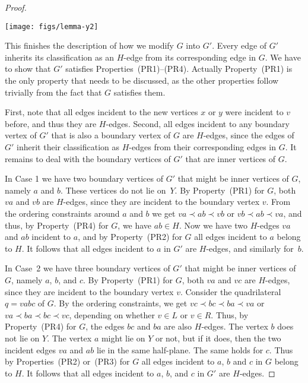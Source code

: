 \begin{proof}
	\begin{figure*}[ht]
          \centering\texttt{[image: figs/lemma-y2]}
          \caption{Proof of  for a reflex
            vertex $v$. Integrating a quadrilateral into the outer face.}
	\end{figure*}
	
	
	
	This finishes the description of how we modify $G$ into $G'$. Every edge of $G'$ inherits its classification as an $H$-edge from its corresponding edge in $G$. We have to show that $G'$ satisfies Properties~(PR1)--(PR4). Actually Property~(PR1) is the only property that needs to be discussed, as the other properties follow trivially from the fact that $G$ satisfies them. 
%	
%	
	
	First, note that all edges incident to the new vertices $x$ or $y$
	were incident to $v$ before, and thus they are $H$-edges. Second,
	all edges incident to any boundary vertex of $G'$ that is also
	a boundary vertex of $G$ are $H$-edges, since the edges of $G'$
	inherit their classification as $H$-edges from their corresponding
	edges in $G$. It remains to deal with the boundary vertices of
	$G'$ that are inner vertices of $G$.

	In Case 1 we have two boundary vertices of $G'$ that might be
	inner vertices of $G$, namely $a$ and $b$. These vertices
	do not lie on~$Y$. By Property~(PR1) for $G$, both $va$ and
	$vb$ are $H$-edges, since they are incident to the boundary
	vertex $v$. From the ordering constraints around $a$ and $b$
	we get $va\prec ab\prec vb$ or $vb\prec ab\prec va$, and thus,
	by Property~(PR4) for $G$, we have $ab\in H$.  Now we have two
	$H$-edges $va$ and $ab$ incident to $a$, and by Property~(PR2)
	for $G$ all edges incident to $a$ belong to $H$. It follows that
	all edges incident to $a$ in $G'$ are $H$-edges, and similarly
	for~$b$.

	In Case~2 we have three boundary vertices of $G'$ that might be inner
	vertices of $G$, namely $a$, $b$, and $c$. By Property~(PR1) for
	$G$, both $va$ and $vc$ are $H$-edges, since they are incident
	to the boundary vertex $v$. Consider the quadrilateral $q=vabc$
	of $G$. By the ordering constraints, we get $vc \prec bc\prec
	ba\prec va$ or $va \prec ba\prec bc\prec vc$, depending on
	whether $v\in L$ or $v\in R$. Thus, by Property~(PR4) for $G$,
	the edges $bc$ and $ba$ are also $H$-edges. The vertex $b$ does
	not lie on $Y$. The vertex $a$ might lie on $Y$ or not, but if it
	does, then the two incident edges $va$ and $ab$ lie in the same
	half-plane.  The same holds for $c$. Thus by Properties~(PR2)
	or~(PR3) for $G$ all edges incident to $a$, $b$ and $c$ in $G$
	belong to $H$. It follows that all edges incident to $a$, $b$,
	and $c$ in $G'$ are $H$-edges.
	

\end{proof}
